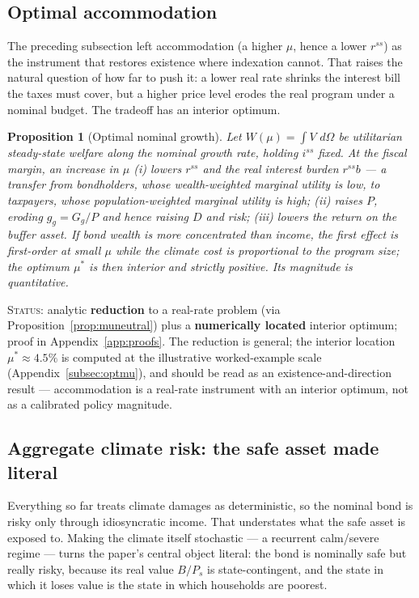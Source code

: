 \documentclass[12pt]{article}
\newtheorem{proposition}{Proposition}
\newcommand{\dd}{\,d}
\begin{document}
\subsection{Optimal accommodation}

The preceding subsection left accommodation (a higher $\mu$, hence a
lower $r^{ss}$) as the instrument that restores existence where
indexation cannot. That raises the natural question of how far to push it:
a lower real rate shrinks the interest bill the taxes must cover, but a
higher price level erodes the real program under a nominal budget. The
tradeoff has an interior optimum.

\begin{proposition}[Optimal nominal growth]\label{prop:optimalmu}
Let $W(\mu)=\int V\,\dd\Omega$ be utilitarian steady-state welfare along the
nominal growth rate, holding $i^{ss}$ fixed. At the fiscal margin, an increase
in $\mu$ (i) lowers $r^{ss}$ and the real interest burden $r^{ss}b$ --- a
transfer from bondholders, whose wealth-weighted marginal utility is low, to
taxpayers, whose population-weighted marginal utility is high; (ii) raises
$P$, eroding $g_g=G_g/P$ and hence raising $D$ and risk; (iii) lowers the
return on the buffer asset. If bond wealth is more concentrated than income,
the first effect is first-order at small $\mu$ while the climate cost is
proportional to the program size; the optimum $\mu^{*}$ is then interior and
strictly positive. Its magnitude is quantitative.
\end{proposition}
\noindent\textsc{Status:} analytic \textbf{reduction} to a real-rate problem
(via Proposition~\ref{prop:muneutral}) plus a \textbf{numerically located}
interior optimum; proof in Appendix~\ref{app:proofs}. The reduction is
general; the interior location $\mu^{*}\approx4.5\%$ is computed at the
illustrative worked-example scale (Appendix~\ref{subsec:optmu}), and should be
read as an existence-and-direction result --- accommodation is a real-rate
instrument with an interior optimum, not as a calibrated policy magnitude.


\subsection{Aggregate climate risk: the safe asset made literal}
\label{subsec:aggrisk}

Everything so far treats climate damages as deterministic, so the nominal
bond is risky only through idiosyncratic income. That understates what the
safe asset is exposed to. Making the climate itself stochastic --- a
recurrent calm/severe regime --- turns the paper's central object literal:
the bond is nominally safe but really risky, because its real value $B/P_s$
is state-contingent, and the state in which it loses value is the state in
which households are poorest.
\end{document}
